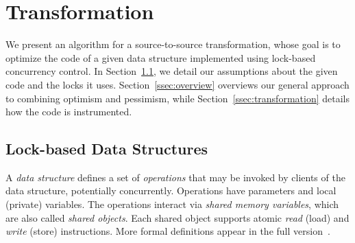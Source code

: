 \renewcommand{\ttdefault}{pcr}
\algrenewcommand{}
\algrenewcommand{}
\algrenewcommand{}
\algrenewcommand{}
\algrenewcommand{}
\algrenewcommand\textproc{\textit}
\newcommand{\codesize}{\footnotesize}



\section{Transformation}\label{sec:algorithm}

We present an algorithm for a source-to-source transformation, whose
goal is to optimize the code of a given data structure implemented using lock-based concurrency control.
In Section~\ref{ssec:locks}, we detail our assumptions about the given code and the locks it uses.
Section~\ref{ssec:overview} overviews our general approach to combining optimism and pessimism,
while
Section~\ref{ssec:transformation} details how the code is instrumented. 

\subsection{Lock-based Data Structures}\label{ssec:locks}

A \emph{data structure} defines a set of \emph{operations} that may be invoked by
clients of the data structure, potentially concurrently.
%
Operations have parameters and local (private) variables. %
%
The operations interact via \emph{shared memory variables}, which are also called \emph{shared objects}.
%
Each shared object supports atomic \emph{read} (load) and \emph{write} (store) instructions.
%
More formal definitions appear in the full version~\cite{fullversion}. 

